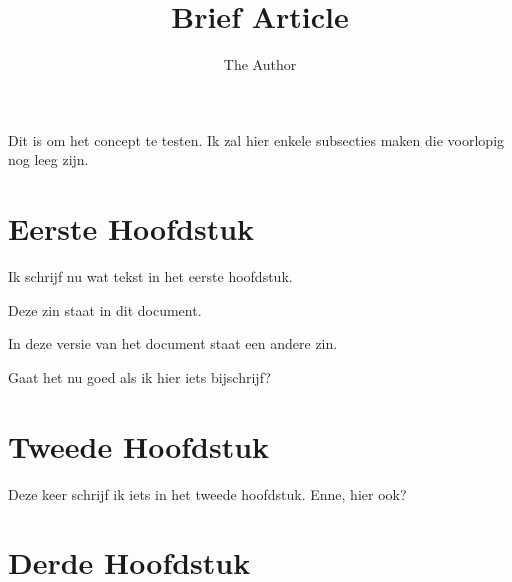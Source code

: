 \documentclass[11pt]{amsart}
\title{Brief Article}
\author{The Author}
\begin{document}
\maketitle

Dit is om het concept te testen.
 Ik zal hier enkele subsecties maken die voorlopig nog leeg zijn.
 
 \section{Eerste Hoofdstuk}
 Ik schrijf nu wat tekst in het eerste hoofdstuk.

 Deze zin staat in dit document.

 In deze versie van het document staat een andere zin.
 
Gaat het nu goed als ik hier iets bijschrijf?

 \section{Tweede Hoofdstuk}
 Deze keer schrijf ik iets in het tweede hoofdstuk.
 Enne, hier ook?
 \section{Derde Hoofdstuk}
\end{document}
